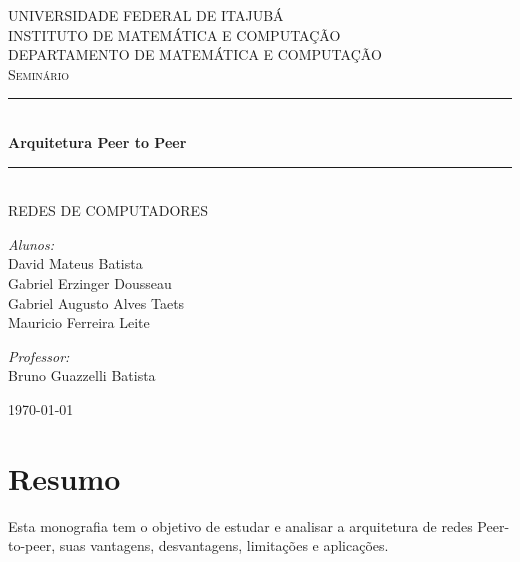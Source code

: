 \documentclass[a4paper]{article}
\newcommand{\HRule}{\rule{\linewidth}{0.5mm}}
\newcommand{\hRule}{\rule{4.5cm}{0.1mm}}
\begin{document}
\onehalfspacing

\begin{titlepage}
\begin{center}

\textsc{\Large UNIVERSIDADE FEDERAL DE ITAJUBÁ\\
	INSTITUTO DE MATEMÁTICA E COMPUTAÇÃO}\\[0.7cm]

\textsc{DEPARTAMENTO DE MATEMÁTICA E COMPUTAÇÃO}\\[2.8cm]

\textsc{\Large Seminário}\\
\HRule \\[0.4cm]
{\Large \bfseries Arquitetura Peer to Peer}
\HRule \\[0.4cm]
\textsc{REDES DE COMPUTADORES}\\[2.8cm]

\begin{minipage}{0.4\textwidth}
\begin{flushleft} \large
\emph{Alunos:}\\[0.43cm]
David Mateus Batista\\
Gabriel Erzinger Dousseau\\
Gabriel Augusto Alves Taets\\
Mauricio Ferreira Leite\\
\end{flushleft}
\end{minipage}
\begin{minipage}{0.4\textwidth}
\begin{flushright} \large
\emph{Professor:}\\[0.4cm]
Bruno Guazzelli Batista
\end{flushright}
\end{minipage}

\vfill

\today

\end{center}
\end{titlepage}

\thispagestyle{empty}

\section*{Resumo}
Esta monografia tem o objetivo de estudar e analisar a arquitetura de redes Peer-to-peer,
suas vantagens, desvantagens, limitações e aplicações.
\newpage
{}
\end{document}
